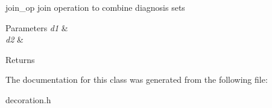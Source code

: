 join\+\_\+op join operation to combine diagnosis sets 


\begin{DoxyParams}{Parameters}
{\em d1} & \\
\hline
{\em d2} & \\
\hline
\end{DoxyParams}
\begin{DoxyReturn}{Returns}

\end{DoxyReturn}


The documentation for this class was generated from the following file\+:\begin{DoxyCompactItemize}
\item 
decoration.\+h\end{DoxyCompactItemize}
